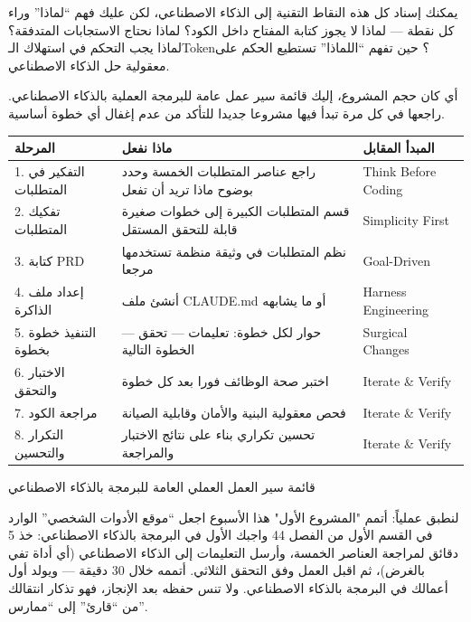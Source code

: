 يمكنك إسناد كل هذه النقاط التقنية إلى الذكاء الاصطناعي، لكن عليك فهم “لماذا” وراء كل نقطة — لماذا لا يجوز كتابة المفتاح داخل الكود؟ لماذا نحتاج الاستجابات المتدفقة؟ لماذا يجب التحكم في استهلاك الـToken؟ حين تفهم “اللماذا” تستطيع الحكم على معقولية حل الذكاء الاصطناعي.


أي كان حجم المشروع، إليك قائمة سير عمل عامة للبرمجة العملية بالذكاء الاصطناعي. راجعها في كل مرة تبدأ فيها مشروعا جديدا للتأكد من عدم إغفال أي خطوة أساسية.

\begin{center}
\begin{tabularx}{\linewidth}{|X|X|X|}
\hline
\textbf{المرحلة} & \textbf{ماذا نفعل} & \textbf{المبدأ المقابل} \tabularnewline
\hline
1. التفكير في المتطلبات & راجع عناصر المتطلبات الخمسة وحدد بوضوح ماذا تريد أن تفعل & Think Before Coding \tabularnewline
2. تفكيك المتطلبات & قسم المتطلبات الكبيرة إلى خطوات صغيرة قابلة للتحقق المستقل & Simplicity First \tabularnewline
3. كتابة PRD & نظم المتطلبات في وثيقة منظمة تستخدمها مرجعا & Goal-Driven \tabularnewline
4. إعداد ملف الذاكرة & أنشئ ملف CLAUDE.md أو ما يشابهه & Harness Engineering \tabularnewline
5. التنفيذ خطوة بخطوة & حوار لكل خطوة: تعليمات — تحقق — الخطوة التالية & Surgical Changes \tabularnewline
6. الاختبار والتحقق & اختبر صحة الوظائف فورا بعد كل خطوة & Iterate \& Verify \tabularnewline
7. مراجعة الكود & فحص معقولية البنية والأمان وقابلية الصيانة & Iterate \& Verify \tabularnewline
8. التكرار والتحسين & تحسين تكراري بناء على نتائج الاختبار والمراجعة & Iterate \& Verify \tabularnewline
\hline
\end{tabularx}
\end{center}

\begin{center}\small\color{gray}قائمة سير العمل العملي العامة للبرمجة بالذكاء الاصطناعي\end{center}

\begin{tcbpractice}{لنطبق عملياً: أتمم "المشروع الأول" هذا الأسبوع}
اجعل “موقع الأدوات الشخصي” الوارد في القسم الأول من الفصل 44 واجبك الأول في البرمجة بالذكاء الاصطناعي: خذ 5 دقائق لمراجعة العناصر الخمسة، وأرسل التعليمات إلى الذكاء الاصطناعي (أي أداة تفي بالغرض)، ثم اقبل العمل وفق التحقق الثلاثي. أتممه خلال 30 دقيقة — ويولد أول أعمالك في البرمجة بالذكاء الاصطناعي. ولا تنس حفظه بعد الإنجاز، فهو تذكار انتقالك من “قارئ” إلى “ممارس”.

\end{tcbpractice}

